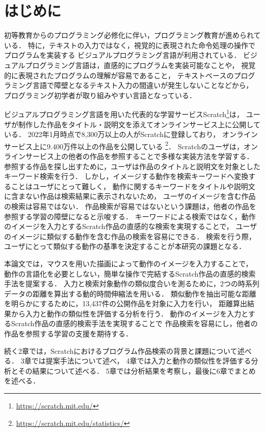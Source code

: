 \documentclass[11pt]{jreport}
\begin{document}
\chapter{はじめに}

初等教育からのプログラミング必修化に伴い，プログラミング教育が進められている．
特に，テキストの入力ではなく，視覚的に表現された命令処理の操作でプログラムを実装する
ビジュアルプログラミング言語が利用されている．
ビジュアルプログラミング言語は，直感的にプログラムを実装可能なことや，
視覚的に表現されたプログラムの理解が容易であること，
テキストベースのプログラミング言語で障壁となるテキスト入力の間違いが発生しないことなどから，
プログラミング初学者が取り組みやすい言語となっている．

ビジュアルプログラミング言語を用いた代表的な学習サービスScratch\footnote{ \url{https://scratch.mit.edu/}}は，
ユーザが制作した作品をタイトル・説明文を添えてオンラインサービス上に公開している．
2022年1月時点で8,300万以上の人がScratchに登録しており，
オンラインサービス上に9.400万件以上の作品を公開している
\footnote{\url{https://scratch.mit.edu/statistics/}}．
Scratchのユーザは，オンラインサービス上の他者の作品を参照することで多様な実装方法を学習する\cite{spfa}．
参照する作品を探し出すために，ユーザは作品のタイトルと説明文を対象としたキーワード検索を行う．
しかし，イメージする動作を検索キーワードへ変換することはユーザにとって難しく，
動作に関するキーワードをタイトルや説明文に含まない作品は検索結果に表示されないため，
ユーザのイメージを含む作品の検索は容易ではない\cite{wild}．
作品検索が容易ではないという課題は，他者の作品を参照する学習の障壁になると示唆する．
キーワードによる検索ではなく，動作のイメージを入力とするScratch作品の直感的な検索を実現することで，
ユーザのイメージに類似する動作を含む作品の検索を容易にできる．
検索を行う際，ユーザにとって類似する動作の基準を決定することが本研究の課題となる．

本論文では，マウスを用いた描画によって動作のイメージを入力することで，
動作の言語化を必要としない，簡単な操作で完結するScratch作品の直感的検索手法を提案する．
入力と検索対象動作の類似度合いを測るために，2つの時系列データの距離を算出する動的時間伸縮法を用いる．
類似動作を抽出可能な距離を明らかにするために，13,437件の公開作品を対象に入力を行い，
距離算出結果から入力と動作の類似性を評価する分析を行う．
動作のイメージを入力とするScratch作品の直感的検索手法を実現することで
作品検索を容易にし，他者の作品を参照する学習の支援を期待する．

続く2章では，Scratchにおけるプログラム作品検索の背景と課題について述べる．
3章では提案手法について述べ，
4章では入力と動作の類似性を評価する分析とその結果について述べる．
5章では分析結果を考察し，最後に6章でまとめを述べる．
\end{document}

